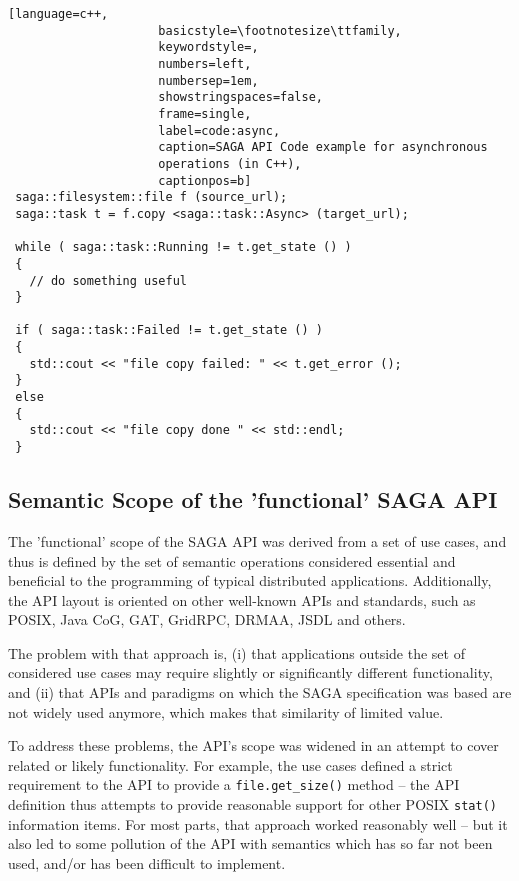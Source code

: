 \documentclass[a4paper,12pt]{article}
\newcommand{\T}[1]{\texttt{#1}}
\begin{document}
  \begin{lstlisting}[language=c++,
                     basicstyle=\footnotesize\ttfamily,
                     keywordstyle=,
                     numbers=left,
                     numbersep=1em,
                     showstringspaces=false,
                     frame=single, 
                     label=code:async,
                     caption=SAGA API Code example for asynchronous
                     operations (in C++),
                     captionpos=b]
 saga::filesystem::file f (source_url);
 saga::task t = f.copy <saga::task::Async> (target_url);

 while ( saga::task::Running != t.get_state () )
 {
   // do something useful
 }

 if ( saga::task::Failed != t.get_state () )
 {
   std::cout << "file copy failed: " << t.get_error ();
 } 
 else
 {
   std::cout << "file copy done " << std::endl;
 }
  \end{lstlisting}


 
 \subsection{Semantic Scope of the 'functional' SAGA API}

  The 'functional' scope of the SAGA API was derived from a set of use
  cases, and thus is defined by the set of semantic operations
  considered essential and beneficial to the programming of typical
  distributed applications.  Additionally, the API layout is oriented
  on other well-known APIs and standards, such as POSIX, Java CoG,
  GAT, GridRPC, DRMAA, JSDL and others.

  The problem with that approach is, (i) that applications outside the
  set of considered use cases may require slightly or significantly
  different functionality, and (ii) that APIs and paradigms on which
  the SAGA specification was based are not widely used anymore, which
  makes that similarity of limited value.

  To address these problems, the API's scope was widened in an attempt
  to cover related or likely functionality.  For example, the use
  cases defined a strict requirement to the API to provide a
  \T{file.get\_size()} method -- the API definition thus attempts to
  provide reasonable support for other POSIX \T{stat()} information
  items.  For most parts, that approach worked reasonably well -- but
  it also led to some pollution of the API with semantics which has so
  far not been used, and/or has been difficult to implement.
\end{document}

